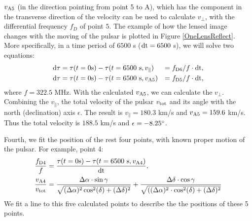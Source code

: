 \documentclass[useAMS,usenatbib]{mn2e}
\begin{document}
$v_{\rm A5}$ (in the direction pointing from point 5 to A), which has the component in the transverse direction of the velocity can be used to calculate $v_{\bot}$, with the differential frequency $f_D$ of point $5$. The example of how the lensed image changes with the moving of the pulsar is plotted in Figure \ref{OneLensReflect}. More specifically, in a time period of $6500$ s ($\rm dt=6500$ s), we will solve two equations: 
\begin{align*}
{\rm d\tau}&=\tau(t=0{\rm s})-\tau(t=6500~{\rm s},v_{\parallel})&=f_{\rm D6}/f\cdot{\rm dt},\\
{\rm d\tau}&=\tau(t=0 {\rm s}) -\tau(t=6500~{\rm s}, v_{\rm A5}) & = f_{\rm D5} /f\cdot{\rm dt},
\end{align*}
where $f=322.5$ MHz. With the calculated $v_{\rm A5}$, we can calculate the $v_{\bot}$. Combining the $v_{\parallel}$, the total velocity of the pulsar $v_{\rm tot}$ and its angle with the north (declination) axis $\epsilon$. The result is $v_{\parallel}=180.3$ km/s and $v_{\rm A5}=159.6$ km/s. Thus the total velocity is $188.5$ km/s and $\epsilon=-8.25\degree$.

Fourth, we fit the position of the rest four points, with known proper motion of the pulsar. For example, point 4:
\begin{align*}
\frac{f_{\rm D4}}{f}&=\frac{\tau(t=0 {\rm s})-\tau(t=6500~{\rm s}, v_{\rm A4})}{\rm dt} ,\\
\frac{v_{\rm A4}}{v_{\rm tot} }&=\frac{\Delta\alpha\cdot\sin{\gamma}}{\sqrt{(\Delta\alpha)^2\cos^2(\delta)+(\Delta\delta)^2}}+\frac{\Delta\delta\cdot\cos{\gamma}}{\sqrt{((\Delta\alpha)^2\cdot\cos^2(\delta)+(\Delta\delta)^2}}
\end{align*}
We fit a line to this five calculated points to describe the the positions of these 5 points. 
\end{document}
